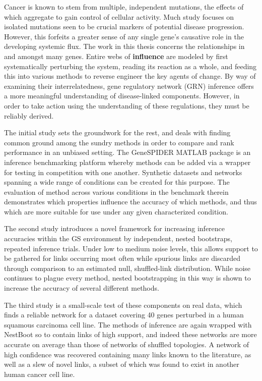 
\begin{abstracts}

Cancer is known to stem from multiple, independent mutations, the effects of which aggregate to gain control of cellular activity. Much study focuses on isolated mutations seen to be crucial markers of potential disease progression. However, this forfeits a greater sense of any single gene's causative role in the developing systemic flux. The work in this thesis concerns the relationships in and amongst many genes. Entire webs of \textbf{influence} are modeled by first systematically perturbing the system, reading its reaction as a whole, and feeding this into various methods to reverse engineer the key agents of change. By way of examining their interrelatedness, gene regulatory network (GRN) inference offers a more meaningful understanding of disease-linked components. However, in order to take action using the understanding of these regulations, they must be reliably derived.

The initial study sets the groundwork for the rest, and deals with finding common ground among the sundry methods in order to compare and rank performance in an unbiased setting. The GeneSPIDER MATLAB package is an inference benchmarking platform whereby methods can be added via a wrapper for testing in competition with one another. Synthetic datasets and networks spanning a wide range of conditions can be created for this purpose. The evaluation of method across various conditions in the benchmark therein demonstrates which properties influence the accuracy of which methods, and thus which are more suitable for use under any given characterized condition.

The second study introduces a novel framework for increasing inference accuracies within the GS environment by independent, nested bootstraps, \ie repeated inference trials. Under low to medium noise levels, this allows support to be gathered for links occurring most often while spurious links are discarded through comparison to an estimated null, shuffled-link distribution. While noise continues to plague every method, nested bootstrapping in this way is shown to increase the accuracy of several different methods.

The third study is a small-scale test of these components on real data, which finds a reliable network for a dataset covering 40 genes perturbed in a human squamous carcinoma cell line. The methods of inference are again wrapped with NestBoot so to contain links of high support, and indeed these networks are more accurate on average than those of networks of shuffled topologies. A network of high confidence was recovered containing many links known to the literature, as well as a slew of novel links, a subset of which was found to exist in another human cancer cell line.


\end{abstracts}
